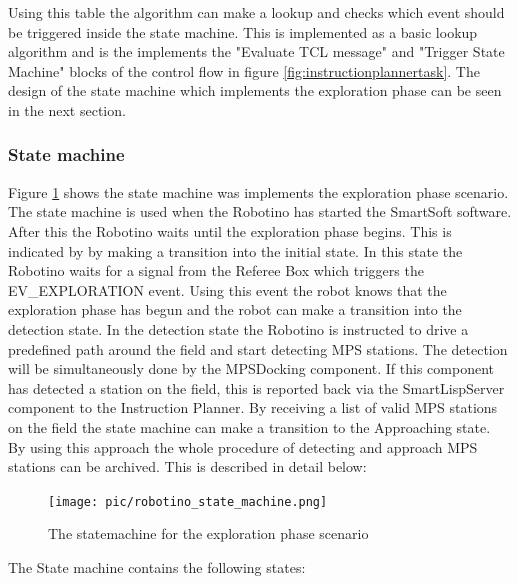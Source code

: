 Using this table the algorithm can make a lookup and checks which event should be triggered inside the state machine. This is implemented as a basic lookup algorithm and is the implements the  "Evaluate TCL message" and "Trigger State Machine" blocks of the control flow in figure \ref{fig:instructionplannertask}. The design of the state machine which implements the exploration phase can be seen in the next section. 
  

\subsubsection{State machine}
\label{sec:state_machine}

Figure \ref{fig:statemachine} shows the state machine was implements the exploration phase scenario. The state machine is used when the Robotino has started the SmartSoft software. After this the Robotino waits until the exploration phase begins. This is indicated by by making a transition into the initial state. In this state the Robotino waits for a signal from the Referee Box which triggers the EV\_EXPLORATION event. Using this event the robot knows that the exploration phase has begun and the robot can make a transition into the detection state. In the detection state the Robotino is instructed to drive a predefined path around the field and start detecting MPS stations. The detection will be simultaneously done by the MPSDocking component. If this component has detected a station on the field, this is reported back via the SmartLispServer component to the Instruction Planner. By receiving a list of valid MPS stations on the field the state machine can make a transition to the Approaching state. By using this approach the whole procedure of detecting and approach MPS stations can be archived. This is described in detail below: \\


\begin{figure}
\centering
\texttt{[image: pic/robotino\_state\_machine.png]}
\caption{The statemachine for the exploration phase scenario}
\label{fig:statemachine}
\end{figure}

\newpage


The State machine contains the following states:

